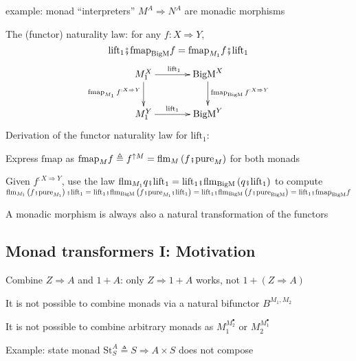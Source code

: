 example: monad ``interpreters'' $M^{A}\Rightarrow N^{A}$ are monadic
morphisms

The (functor) naturality law: for any $f:X\Rightarrow Y$, {\footnotesize{}\vspace{-0.1cm}}
\[
\text{lift}_{1}\bef\text{fmap}_{\text{BigM}}f=\text{fmap}_{M_{1}}f\bef\text{lift}_{1}
\]
{\footnotesize{}\vspace{-0.5cm}
\[
\xymatrix{\xyScaleY{2pc}\xyScaleX{3pc}M_{1}^{X}\ar[d]\sb(0.45){\text{fmap}_{M_{1}}\,f^{:X\Rightarrow Y}}\ar[r]\sp(0.45){\ \text{lift}_{1}} & \text{BigM}^{X}\ar[d]\sp(0.45){\text{fmap}_{\text{BigM}}\,f^{:X\Rightarrow Y}}\\
M_{1}^{Y}\ar[r]\sp(0.45){\text{lift}_{1}} & \text{BigM}^{Y}
}
\]
}Derivation of the functor naturality law for $\text{lift}_{1}$:

Express $\text{fmap}$ as $\text{fmap}_{M}f\triangleq f^{\uparrow M}=\text{flm}_{M}\left(f\bef\text{pure}_{M}\right)$
for both monads

Given $f^{:X\Rightarrow Y}$, use the law {\footnotesize{}$\text{flm}_{M_{1}}q\bef\text{lift}_{1}=\text{lift}_{1}\bef\text{flm}_{\text{BigM}}\left(q\bef\text{lift}_{1}\right)$}
to compute {\footnotesize{}$\text{flm}_{M_{1}}\left(f\bef\text{pure}_{M_{1}}\right)\bef\text{lift}_{1}=\text{lift}_{1}\bef\text{flm}_{\text{BigM}}\left(f\bef\text{pure}_{M_{1}}\bef\text{lift}_{1}\right)=\text{lift}_{1}\bef\text{flm}_{\text{BigM}}\left(f\bef\text{pure}_{\text{BigM}}\right)=\text{lift}_{1}\bef\text{fmap}_{\text{BigM}}f$}{\footnotesize\par}

A monadic morphism is always also a natural transformation of the
functors


\subsection{Monad transformers I: Motivation}

{\footnotesize{}\vspace{-0.2cm}}Combine $Z\Rightarrow A$ and $1+A$:
only $Z\Rightarrow1+A$ works, not $1+\left(Z\Rightarrow A\right)$

It is not possible to combine monads via a natural bifunctor $B^{M_{1},M_{2}}$

It is not possible to combine arbitrary monads as $M_{1}^{M_{2}^{\bullet}}$
or $M_{2}^{M_{1}^{\bullet}}$

Example: state monad $\text{St}_{S}^{A}\triangleq S\Rightarrow A\times S$
does not compose

